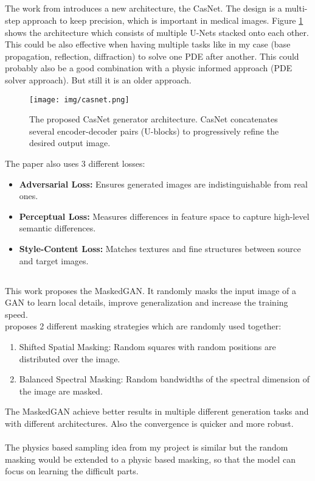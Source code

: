 		\subsection{}
			The work from \citeauthor{armanious_medgan_2020} introduces a new architecture, the CasNet. The design is a multi-step approach to keep precision, which is important in medical images. Figure \ref{fig:casnet} shows the architecture which consists of multiple U-Nets stacked onto each other.\\
			This could be also effective when having multiple tasks like in my case (base propagation, reflection, diffraction) to solve one PDE after another. This could probably also be a good combination with a physic informed approach (PDE solver approach). But still it is an older approach.
			\begin{figure}[H]
				\centering
				\texttt{[image: img/casnet.png]}
				\caption[CasNet]{The proposed CasNet generator architecture. CasNet concatenates several encoder-decoder pairs (U-blocks) to progressively refine the desired output image.}
				\label{fig:casnet}
			\end{figure}
			\FloatBarrier
			The paper also uses 3 different losses:
			\begin{itemize}
				\item \textbf{Adversarial Loss:} Ensures generated images are indistinguishable from real ones.
				\item \textbf{Perceptual Loss:} Measures differences in feature space to capture high-level semantic differences.
				\item \textbf{Style-Content Loss:} Matches textures and fine structures between source and target images.
			\end{itemize}
			
		
		\subsection{}
			This work proposes the MaskedGAN. It randomly masks the input image of a GAN to learn local details, improve generalization and increase the training speed. \\
			\citeauthor{huang_masked_2022} proposes 2 different masking strategies which are randomly used together:
			\begin{enumerate}
				\item Shifted Spatial Masking: Random squares with random positions are distributed over the image.
				\item Balanced Spectral Masking: Random bandwidths of the spectral dimension of the image are masked.
			\end{enumerate}
			The MaskedGAN achieve better results in multiple different generation tasks and with different architectures. Also the convergence is quicker and more robust.\\
			\\
			The physics based sampling idea from my project is similar but the random masking would be extended to a physic based masking, so that the model can focus on learning the difficult parts. 
			
